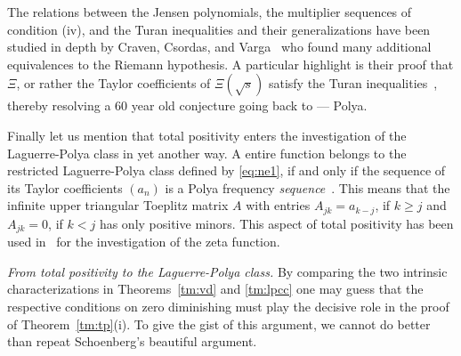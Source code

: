 \documentclass{article}
\newcommand{\tmem}[1]{{\em #1\/}}
\newcommand{\fif}{if and only if}
\providecommand{\*}{{\opl}}
\newcommand{\<}{}
\newcommand{\>}{}
\newcommand{\lpc}{Laguerre-Polya class}
\begin{document}
The relations between the Jensen polynomials, the multiplier sequences of
condition (iv), and the Turan inequalities and their generalizations have been
studied in depth by Craven, Csordas, and Varga~{\cite{Cso15,CC89,CV90}} who
found many additional equivalences to the Riemann hypothesis. A particular
highlight is their proof that $\Xi$, or rather the Taylor coefficients of $\Xi
(\sqrt{s})$ satisfy the Turan inequalities~{\cite{CNV86}}, thereby resolving a
60 year old conjecture going back to --- Polya.

Finally let us mention that total positivity enters the investigation of the
{\lpc} in yet another way. A entire function belongs to the restricted {\lpc}
defined by \eqref{eq:ne1}, {\fif} the sequence of its Taylor coefficients
$(a_n)$ is a Polya frequency {\tmem{sequence}}~{\cite{AS52}}. This means that
the infinite upper triangular Toeplitz matrix $A$ with entries $A_{jk} = a_{k
- j}$, if $k \geq j$ and $A_{jk} = 0$, if $k < j$ has only positive minors.
This aspect of total positivity has been used in~{\cite{Kat07,Nut13}} for the
investigation of the zeta function.

{\tmem{From total positivity to the {\lpc}.}} By comparing the two intrinsic
characterizations in Theorems~\ref{tm:vd} and \ref{tm:lpcc} one may guess that
the respective conditions on zero diminishing must play the decisive role in
the proof of Theorem~\ref{tm:tp}(i). To give the gist of this argument, we
cannot do better than repeat Schoenberg's beautiful argument.
\end{document}
